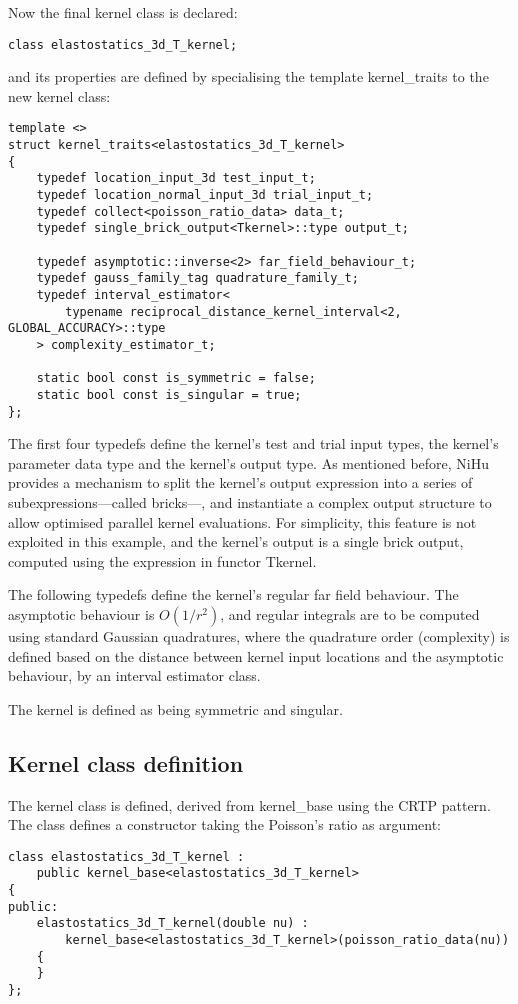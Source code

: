 \documentclass{article}
\begin{document}
Now the final kernel class is declared:
%
\begin{lstlisting}
class elastostatics_3d_T_kernel;
\end{lstlisting}
%
and its properties are defined by specialising the template kernel\_traits to the new kernel class:
%
\begin{lstlisting}
template <>
struct kernel_traits<elastostatics_3d_T_kernel>
{
	typedef location_input_3d test_input_t;
	typedef location_normal_input_3d trial_input_t;
	typedef collect<poisson_ratio_data> data_t;
	typedef single_brick_output<Tkernel>::type output_t;
	
	typedef asymptotic::inverse<2> far_field_behaviour_t;
	typedef gauss_family_tag quadrature_family_t;
	typedef interval_estimator<
		typename reciprocal_distance_kernel_interval<2, GLOBAL_ACCURACY>::type
	> complexity_estimator_t;
	
	static bool const is_symmetric = false;
	static bool const is_singular = true;
};
\end{lstlisting}
%
The first four typedefs define the kernel's test and trial input types, the kernel's parameter data type and the kernel's output type.
As mentioned before, NiHu provides a mechanism to split the kernel's output expression into a series of subexpressions---called bricks---, and instantiate a complex output structure to allow optimised parallel kernel evaluations.
For simplicity, this feature is not exploited in this example, and the kernel's output is a single brick output, computed using the expression in functor Tkernel.

The following typedefs define the kernel's regular far field behaviour.
The asymptotic behaviour is $O(1/r^2)$, and regular integrals are to be computed using standard Gaussian quadratures, where the quadrature order (complexity) is defined based on the distance between kernel input locations and the asymptotic behaviour, by an interval estimator class.

The kernel is defined as being symmetric %
and singular.

\subsection{Kernel class definition}

The kernel class is defined, derived from kernel\_base using the CRTP pattern.
The class defines a constructor taking the Poisson's ratio as argument:
%
\begin{lstlisting}
class elastostatics_3d_T_kernel :
	public kernel_base<elastostatics_3d_T_kernel>
{
public:
	elastostatics_3d_T_kernel(double nu) :
		kernel_base<elastostatics_3d_T_kernel>(poisson_ratio_data(nu))
	{
	}
};
\end{lstlisting}
\end{document}
